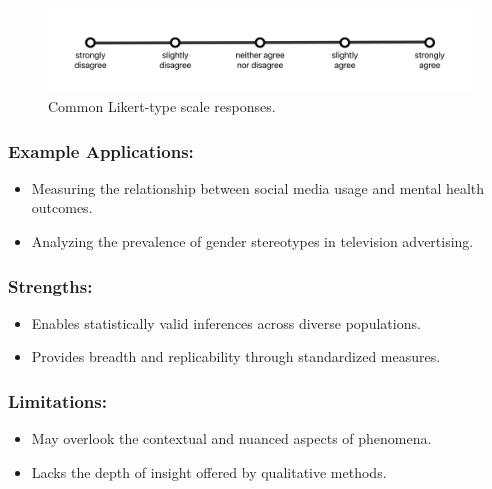\documentclass[
]{book}
\providecommand{\tightlist}{%
  \setlength{\itemsep}{0pt}\setlength{\parskip}{0pt}}
\begin{document}
\begin{figure}
\centering
\includegraphics[width=1\linewidth,height=\textheight,keepaspectratio]{images/likert-scale.png}
\caption{Common Likert-type scale responses.}
\end{figure}

\subsubsection*{Example Applications:}\label{example-applications-1}

\begin{itemize}
\tightlist
\item
  Measuring the relationship between social media usage and mental health outcomes.
\item
  Analyzing the prevalence of gender stereotypes in television advertising.
\end{itemize}

\subsubsection*{Strengths:}\label{strengths-1}

\begin{itemize}
\tightlist
\item
  Enables statistically valid inferences across diverse populations.
\item
  Provides breadth and replicability through standardized measures.
\end{itemize}

\subsubsection*{Limitations:}\label{limitations-1}

\begin{itemize}
\tightlist
\item
  May overlook the contextual and nuanced aspects of phenomena.
\item
  Lacks the depth of insight offered by qualitative methods.
\end{itemize}
\end{document}
